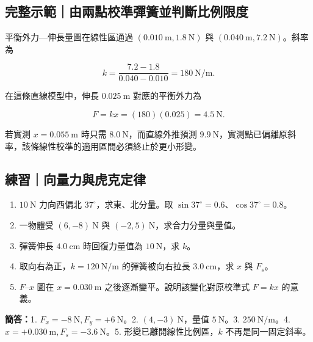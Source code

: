 \documentclass[11pt,a4paper]{article}
\providecommand{\tightlist}{%
  \setlength{\itemsep}{0pt}\setlength{\parskip}{0pt}}
\begin{document}
\begin{HandoutWorkedExample}

\subsection{完整示範｜由兩點校準彈簧並判斷比例限度}\label{ux5b8cux6574ux793aux7bc4ux7531ux5169ux9edeux6821ux6e96ux5f48ux7c27ux4e26ux5224ux65b7ux6bd4ux4f8bux9650ux5ea6}

平衡外力---伸長量圖在線性區通過 \((0.010\ \mathrm m,1.8\ \mathrm N)\) 與 \((0.040\ \mathrm m,7.2\ \mathrm N)\)。斜率為

\[
k=\frac{7.2-1.8}{0.040-0.010}
=180\ \mathrm{N/m}.
\]

在這條直線模型中，伸長 \(0.025\ \mathrm m\) 對應的平衡外力為

\[
F=kx=(180)(0.025)=4.5\ \mathrm N.
\]

若實測 \(x=0.055\ \mathrm m\) 時只需 \(8.0\ \mathrm N\)，而直線外推預測 \(9.9\ \mathrm N\)，實測點已偏離原斜率，該條線性校準的適用區間必須終止於更小形變。

\end{HandoutWorkedExample}

\begin{HandoutSelfCheck}

\subsection{練習｜向量力與虎克定律}\label{ux7df4ux7fd2ux5411ux91cfux529bux8207ux864eux514bux5b9aux5f8b}

\begin{enumerate}
\def\labelenumi{\arabic{enumi}.}
\tightlist
\item
  \(10\ \mathrm N\) 力向西偏北 \(37^\circ\)，求東、北分量。取 \(\sin37^\circ=0.6\)、\(\cos37^\circ=0.8\)。
\item
  一物體受 \((6,-8)\ \mathrm N\) 與 \((-2,5)\ \mathrm N\)，求合力分量與量值。
\item
  彈簧伸長 \(4.0\ \mathrm{cm}\) 時回復力量值為 \(10\ \mathrm N\)，求 \(k\)。
\item
  取向右為正，\(k=120\ \mathrm{N/m}\) 的彈簧被向右拉長 \(3.0\ \mathrm{cm}\)，求 \(x\) 與 \(F_s\)。
\item
  \(F\)--\(x\) 圖在 \(x=0.030\ \mathrm m\) 之後逐漸變平。說明該變化對原校準式 \(F=kx\) 的意義。
\end{enumerate}

\textbf{簡答：}1. \(F_x=-8\ \mathrm N, F_y=+6\ \mathrm N\)。2. \((4,-3)\ \mathrm N\)，量值 \(5\ \mathrm N\)。3. \(250\ \mathrm{N/m}\)。4. \(x=+0.030\ \mathrm m, F_s=-3.6\ \mathrm N\)。5. 形變已離開線性比例區，\(k\) 不再是同一固定斜率。

\end{HandoutSelfCheck}
\end{document}
